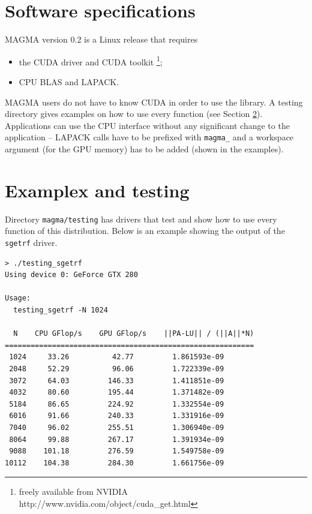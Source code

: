 \documentclass[10pt]{book}
\newcommand {\hhh} {\hspace{10mm}}
\begin{document}
\vspace{0.2in}
\section{Software specifications}
MAGMA version 0.2 is a Linux release that requires
\begin{itemize}
  \item the CUDA driver and CUDA toolkit
        \footnote{freely available from NVIDIA\\
                \hhh  http://www.nvidia.com/object/cuda\_get.html};
  \item CPU BLAS and LAPACK.
\end{itemize}

MAGMA users do not have to know CUDA in order to use the library. 
A testing directory gives examples on how to use every function (see Section 
\ref{testing}). Applications can use the CPU interface without any 
significant change to the application -- LAPACK calls have to be prefixed with
{\tt magma\_} and a workspace argument (for the GPU memory) has to be 
added (shown in the examples).

\newpage

\section{Examplex and testing}\label{testing}
Directory {\tt magma/testing} has drivers that test and show how
to use every function of this distribution. Below is an example
showing the output of the {\tt sgetrf} driver.

\begin{verbatim}
> ./testing_sgetrf
Using device 0: GeForce GTX 280

Usage: 
  testing_sgetrf -N 1024

  N    CPU GFlop/s    GPU GFlop/s    ||PA-LU|| / (||A||*N)
==========================================================
 1024     33.26          42.77         1.861593e-09
 2048     52.29          96.06         1.722339e-09
 3072     64.03         146.33         1.411851e-09
 4032     80.60         195.44         1.371482e-09
 5184     86.65         224.92         1.332554e-09
 6016     91.66         240.33         1.331916e-09
 7040     96.02         255.51         1.306940e-09
 8064     99.88         267.17         1.391934e-09
 9088    101.18         276.59         1.549758e-09
10112    104.38         284.30         1.661756e-09

\end{verbatim}
\end{document}
